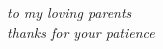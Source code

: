 
\begin{dedication} 

\textit{to my loving parents\\ \medskip thanks for your patience}

\end{dedication}

